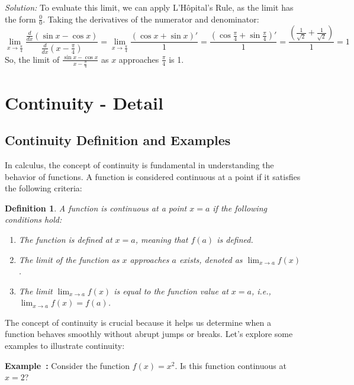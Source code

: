 \documentclass[a4paper,12pt]{book}
\newenvironment{solution}[1][]
{\par\noindent\textit{Solution:} \rmfamily}{\medskip}
\newcounter{example}
\newenvironment{example}[1][\theexample]
  {\refstepcounter{example}\par\medskip\noindent\textbf{Example~#1:} \rmfamily}
  {\medskip}
\newtheorem{definition}{Definition}
\begin{document}
\begin{solution}
To evaluate this limit, we can apply L'Hôpital's Rule, as the limit has the form \(\frac{0}{0}\). Taking the derivatives of the numerator and denominator:
\[
\lim_{{x \to \frac{\pi}{4}}} \frac{\frac{d}{dx}(\sin x - \cos x)}{\frac{d}{dx}(x - \frac{\pi}{4})} = \lim_{{x \to \frac{\pi}{4}}} \frac{(\cos x + \sin x)'}{1} = \frac{(\cos \frac{\pi}{4} + \sin \frac{\pi}{4})'}{1} = \frac{\left(\frac{1}{\sqrt{2}} + \frac{1}{\sqrt{2}}\right)}{1} = 1
\]
So, the limit of \(\frac{\sin x - \cos x}{x - \frac{\pi}{4}}\) as \(x\) approaches \(\frac{\pi}{4}\) is 1.
\end{solution}

\section{Continuity - Detail}
\subsection{Continuity Definition and Examples}

In calculus, the concept of continuity is fundamental in understanding the behavior of functions. A function is considered continuous at a point if it satisfies the following criteria:

\begin{definition}
A function is continuous at a point \(x = a\) if the following conditions hold:
\begin{enumerate}
  \item The function is defined at \(x = a\), meaning that \(f(a)\) is defined.
  \item The limit of the function as \(x\) approaches \(a\) exists, denoted as \(\lim_{{x \to a}} f(x)\).
  \item The limit \(\lim_{{x \to a}} f(x)\) is equal to the function value at \(x = a\), i.e., \(\lim_{{x \to a}} f(x) = f(a)\).
\end{enumerate}
\end{definition}

The concept of continuity is crucial because it helps us determine when a function behaves smoothly without abrupt jumps or breaks. Let's explore some examples to illustrate continuity:

\begin{example}
Consider the function \(f(x) = x^2\). Is this function continuous at \(x = 2\)?
\end{example}
\end{document}
